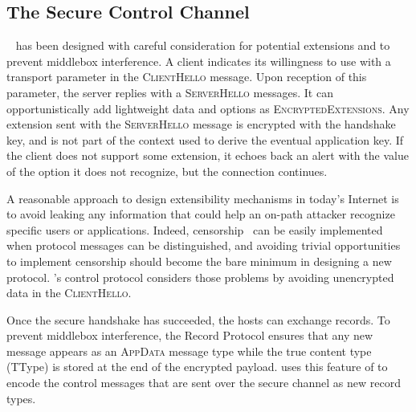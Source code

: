 
\subsection{The Secure Control Channel}\label{sec:extending}

~\cite{rfc8446} has been designed with careful consideration for
potential extensions and to prevent middlebox interference. A \tcpls client
indicates its willingness to use \tcpls with a transport parameter in the
\textsc{ClientHello} message. Upon reception of this parameter, the server
replies with a \textsc{ServerHello} messages. It can opportunistically add
lightweight \tcpls data and \tcp options as \textsc{EncryptedExtensions}. Any
extension sent with the \textsc{ServerHello} message is encrypted with the
handshake key, and is not part of the context used to derive the eventual
application key. If the client does not support some extension, it echoes back
an alert with the value of the option it does not recognize, but the connection
continues.

A reasonable approach to design extensibility mechanisms in today's Internet
is to avoid leaking any information that could help an on-path attacker
recognize specific users or applications. Indeed, censorship~\cite{Morshed2017a,
Gosain2017a,Chai2019a} can be easily implemented when protocol messages can be
distinguished, and avoiding trivial opportunities to implement censorship should
become the bare minimum in designing a new protocol. \tcpls's control protocol
considers those problems by avoiding unencrypted data in the
\textsc{ClientHello}.

Once the secure handshake has succeeded, the hosts can exchange \tls records.
To prevent middlebox interference, the  Record Protocol ensures that any
new message appears as an \textsc{AppData} message type while the true content
type (TType) is stored at the end of the encrypted payload. \tcpls uses this
feature of  to encode the control messages that are sent over the secure
channel as new \tls record types.



